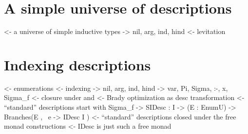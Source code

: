 \documentclass[preprint, authoryear]{sigplanconf}
\newenvironment{structure}{\footnotesize\verbatim}{\endverbatim}
\begin{document}


\section{A simple universe of descriptions}

\begin{structure}
<- a universe of simple inductive types
    -> nil, arg, ind, hind
<- levitation
\end{structure}


\section{Indexing descriptions}


\begin{structure}
<- enumerations
<- indexing
    -> nil, arg, ind, hind
    -> var, Pi, Sigma, :-, x, Sigma_f
<- closure under \box and \diamond
<- Brady optimization as desc transformation
<- ``standard'' descriptions start with Sigma_f
    -> SIDesc : I -> (E : EnumU) -> Branches(E , \ e -> IDesc I )
<- ``standard'' descriptions closed under the free monad constructions
<- IDesc is just such a free monad
\end{structure}
\end{document}
